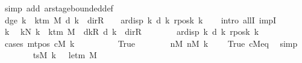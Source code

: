 \begin{isabellebody}
\ {\isacharparenleft}{\kern0pt}simp\ add{\isacharcolon}{\kern0pt}\ ar{\isacharunderscore}{\kern0pt}stage{\isacharunderscore}{\kern0pt}bounded{\isacharunderscore}{\kern0pt}def{\isacharparenright}{\kern0pt}\isanewline
\ \ \isamarkupfalse%
\ dge{}{\isacharcolon}{\kern0pt}\ {\isachardoublequoteopen}{\isasymforall}k\ {\isacharless}{\kern0pt}\ k{\isacharunderscore}{\kern0pt}tm\ M{\isachardot}{\kern0pt}\ d\ k\ {\isasymnoteq}\ dir{\isachardot}{\kern0pt}R\ {\isasymlongrightarrow}\ {}\ {\isacharless}{\kern0pt}\ ar{\isacharunderscore}{\kern0pt}disp\ {\isacharquery}{\kern0pt}k\ {\isacharparenleft}{\kern0pt}d\ k{\isacharparenright}{\kern0pt}\ {\isacharparenleft}{\kern0pt}{\isacharquery}{\kern0pt}rposk\ k{\isacharparenright}{\kern0pt}{\isachardoublequoteclose}\isanewline
\ \ \isamarkupfalse%
\ {\isacharparenleft}{\kern0pt}intro\ allI\ impI{\isacharparenright}{\kern0pt}\isanewline
\ \ \ \ \isamarkupfalse%
\ k\ \isamarkupfalse%
\ kN{\isacharcolon}{\kern0pt}\ {\isachardoublequoteopen}k\ {\isacharless}{\kern0pt}\ k{\isacharunderscore}{\kern0pt}tm\ M{\isachardoublequoteclose}\ \ dkR{\isacharcolon}{\kern0pt}\ {\isachardoublequoteopen}d\ k\ {\isasymnoteq}\ dir{\isachardot}{\kern0pt}R{\isachardoublequoteclose}\isanewline
\ \ \ \ \isamarkupfalse%
\ {\isachardoublequoteopen}{}\ {\isacharless}{\kern0pt}\ ar{\isacharunderscore}{\kern0pt}disp\ {\isacharquery}{\kern0pt}k\ {\isacharparenleft}{\kern0pt}d\ k{\isacharparenright}{\kern0pt}\ {\isacharparenleft}{\kern0pt}{\isacharquery}{\kern0pt}rposk\ k{\isacharparenright}{\kern0pt}{\isachardoublequoteclose}\isanewline
\ \ \ \ \isamarkupfalse%
\ {\isacharparenleft}{\kern0pt}cases\ {\isachardoublequoteopen}mt{\isacharunderscore}{\kern0pt}pos\ cM\ k\ {\isacharequal}{\kern0pt}\ {}{\isachardoublequoteclose}{\isacharparenright}{\kern0pt}\isanewline
\ \ \ \ \ \ \isamarkupfalse%
\ True\isanewline
\ \ \ \ \ \ \isamarkupfalse%
\ nM{}{\isacharcolon}{\kern0pt}\ {\isachardoublequoteopen}nM\ k\ {\isacharequal}{\kern0pt}\ {}{\isachardoublequoteclose}\ \isamarkupfalse%
\ True\ cM{\isacharunderscore}{\kern0pt}eq\ \isamarkupfalse%
\ simp\isanewline
\ \ \ \ \ \ \isamarkupfalse%
\ {\isachardoublequoteopen}tsM\ k\ {}\ {\isacharequal}{\kern0pt}\ le{\isacharunderscore}{\kern0pt}tm\ M{\isachardoublequoteclose}\ \isamarkupfalse%

\end{isabellebody}
